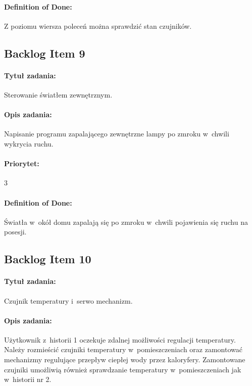 	\paragraph{Definition of Done:}
	Z poziomu wiersza poleceń można sprawdzić stan czujników.
	


	\subsection{Backlog Item 9}
	\paragraph{Tytuł zadania:}
	Sterowanie światłem zewnętrznym.
	
	\paragraph{Opis zadania:} 
	Napisanie programu zapalającego zewnętrzne lampy po zmroku w~chwili wykrycia ruchu. 
	
	\paragraph{Priorytet:}
	3
	
	\paragraph{Definition of Done:}
	Światła w~okół domu zapalają się po zmroku w~chwili pojawienia się ruchu na posesji.



	\subsection{Backlog Item 10}
	\paragraph{Tytuł zadania:}
	Czujnik temperatury i~serwo mechanizm.
	
	\paragraph{Opis zadania:} 
	Użytkownik z~historii 1 oczekuje zdalnej możliwości regulacji temperatury. Należy rozmieścić czujniki temperatury w~pomieszczeniach oraz zamontować mechanizmy regulujące przepływ ciepłej wody przez kaloryfery. Zamontowane czujniki umożliwią również sprawdzanie temperatury w~pomieszczeniach jak w~historii nr 2.
	
